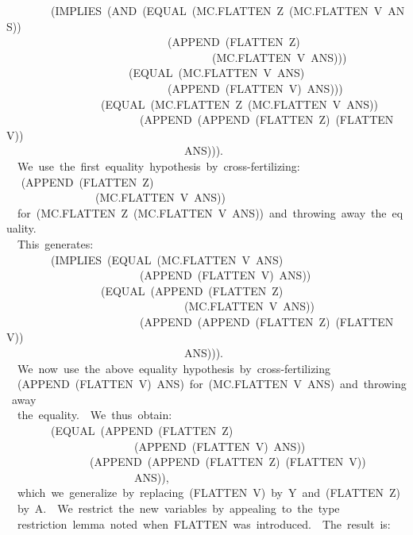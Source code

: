 \documentclass[10pt]{book}
\newenvironment{pubasis}{\begin{flushleft}}{\end{flushleft}}
\begin{document}
\begin{pubasis}
~~~~~~~~(IMPLIES~(AND~(EQUAL~(MC.FLATTEN~Z~(MC.FLATTEN~V~ANS))\\
~~~~~~~~~~~~~~~~~~~~~~~~~~~~~(APPEND~(FLATTEN~Z)\\
~~~~~~~~~~~~~~~~~~~~~~~~~~~~~~~~~~~~~(MC.FLATTEN~V~ANS)))\\
~~~~~~~~~~~~~~~~~~~~~~(EQUAL~(MC.FLATTEN~V~ANS)\\
~~~~~~~~~~~~~~~~~~~~~~~~~~~~~(APPEND~(FLATTEN~V)~ANS)))\\
~~~~~~~~~~~~~~~~~(EQUAL~(MC.FLATTEN~Z~(MC.FLATTEN~V~ANS))\\
~~~~~~~~~~~~~~~~~~~~~~~~(APPEND~(APPEND~(FLATTEN~Z)~(FLATTEN~V))\\
~~~~~~~~~~~~~~~~~~~~~~~~~~~~~~~~ANS))).\\

~~We~use~the~first~equality~hypothesis~by~cross-fertilizing:\\
~~	(APPEND~(FLATTEN~Z)\\
~~~~~~~~~~~~~~~~(MC.FLATTEN~V~ANS))\\
~~for~(MC.FLATTEN~Z~(MC.FLATTEN~V~ANS))~and~throwing~away~the~equality.\\
~~This~generates:\\

~~~~~~~~(IMPLIES~(EQUAL~(MC.FLATTEN~V~ANS)\\
~~~~~~~~~~~~~~~~~~~~~~~~(APPEND~(FLATTEN~V)~ANS))\\
~~~~~~~~~~~~~~~~~(EQUAL~(APPEND~(FLATTEN~Z)\\
~~~~~~~~~~~~~~~~~~~~~~~~~~~~~~~~(MC.FLATTEN~V~ANS))\\
~~~~~~~~~~~~~~~~~~~~~~~~(APPEND~(APPEND~(FLATTEN~Z)~(FLATTEN~V))\\
~~~~~~~~~~~~~~~~~~~~~~~~~~~~~~~~ANS))).\\

~~We~now~use~the~above~equality~hypothesis~by~cross-fertilizing\\
~~(APPEND~(FLATTEN~V)~ANS)~for~(MC.FLATTEN~V~ANS)~and~throwing~away\\
~~the~equality.~~We~thus~obtain:\\

~~~~~~~~(EQUAL~(APPEND~(FLATTEN~Z)\\
~~~~~~~~~~~~~~~~~~~~~~~(APPEND~(FLATTEN~V)~ANS))\\
~~~~~~~~~~~~~~~(APPEND~(APPEND~(FLATTEN~Z)~(FLATTEN~V))\\
~~~~~~~~~~~~~~~~~~~~~~~ANS)),\\

~~which~we~generalize~by~replacing~(FLATTEN~V)~by~Y~and~(FLATTEN~Z)\\
~~by~A.~~We~restrict~the~new~variables~by~appealing~to~the~type\\
~~restriction~lemma~noted~when~FLATTEN~was~introduced.~~The~result~is:\\


\end{pubasis}
\end{document}
